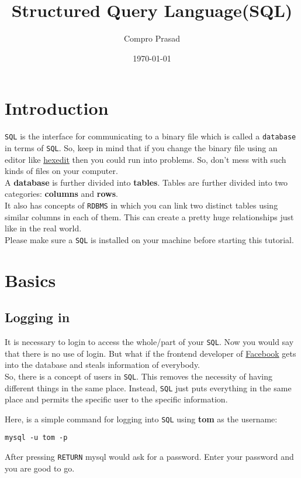 \documentclass[11pt]{article}
\author{Compro Prasad}
\date{\today}
\title{Structured Query Language(SQL)}
\begin{document}
\maketitle
\tableofcontents

\section{Introduction}
\label{sec:orgheadline1}
\texttt{SQL} is the interface for communicating to a binary file
which is called a \texttt{database} in terms of \texttt{SQL}. So, keep in
mind that if you change the binary file using an editor like
\href{http://hexedit.com/}{hexedit} then you could run into problems. So, don't mess
with such kinds of files on your computer.\\
A \textbf{database} is further divided into \textbf{tables}. Tables are further
divided into two categories: \textbf{columns} and \textbf{rows}.\\
It also has concepts of \texttt{RDBMS} in which you can link two
distinct tables using similar columns in each of them. This
can create a pretty huge relationships just like in the real world.\\
Please make sure a \texttt{SQL} is installed on your machine before
starting this tutorial.
\section{Basics}
\label{sec:orgheadline10}
\subsection{Logging in}
\label{sec:orgheadline2}
It is necessary to login to access the whole/part of your
\texttt{SQL}. Now you would say that there is no use of login. But
what if the frontend developer of \href{https://facebook.com}{Facebook} gets into the
database and steals information of everybody.\\
So, there is a concept of users in \texttt{SQL}. This removes the
necessity of having different things in the same place.
Instead, \texttt{SQL} just puts everything in the same place and
permits the specific user to the specific information.

Here, is a simple command for logging into \texttt{SQL} using
\textbf{tom} as the username:
\begin{verbatim}
mysql -u tom -p
\end{verbatim}
After pressing \texttt{RETURN} mysql would ask for a password.
Enter your password and you are good to go.
\end{document}

